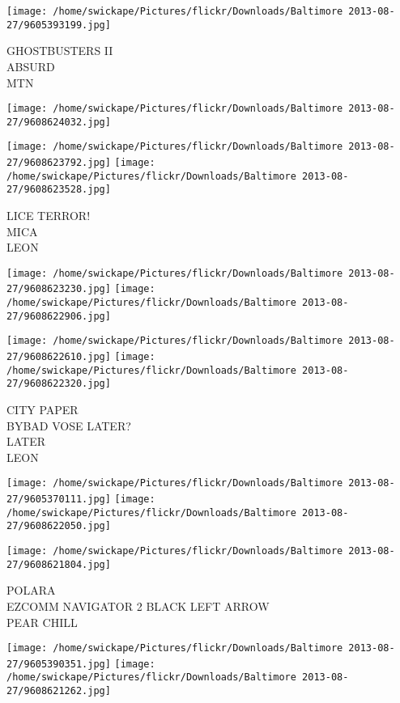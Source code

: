 \documentclass[10pt,letterpaper]{article}
\begin{document}
\texttt{[image: /home/swickape/Pictures/flickr/Downloads/Baltimore 2013-08-27/9605393199.jpg]}

GHOSTBUSTERS II\\
ABSURD\\
MTN
\pagebreak

\texttt{[image: /home/swickape/Pictures/flickr/Downloads/Baltimore 2013-08-27/9608624032.jpg]}

\vspace{0.25in}
\texttt{[image: /home/swickape/Pictures/flickr/Downloads/Baltimore 2013-08-27/9608623792.jpg]}
\texttt{[image: /home/swickape/Pictures/flickr/Downloads/Baltimore 2013-08-27/9608623528.jpg]}

LICE TERROR!\\
MICA\\
LEON
\pagebreak

\texttt{[image: /home/swickape/Pictures/flickr/Downloads/Baltimore 2013-08-27/9608623230.jpg]}
\texttt{[image: /home/swickape/Pictures/flickr/Downloads/Baltimore 2013-08-27/9608622906.jpg]}

\texttt{[image: /home/swickape/Pictures/flickr/Downloads/Baltimore 2013-08-27/9608622610.jpg]}
\texttt{[image: /home/swickape/Pictures/flickr/Downloads/Baltimore 2013-08-27/9608622320.jpg]}

CITY PAPER\\
BYBAD VOSE LATER?\\
LATER\\
LEON
\pagebreak

\texttt{[image: /home/swickape/Pictures/flickr/Downloads/Baltimore 2013-08-27/9605370111.jpg]}
\texttt{[image: /home/swickape/Pictures/flickr/Downloads/Baltimore 2013-08-27/9608622050.jpg]}

\vspace{0.25in}
\texttt{[image: /home/swickape/Pictures/flickr/Downloads/Baltimore 2013-08-27/9608621804.jpg]}

POLARA\\
EZCOMM NAVIGATOR 2 BLACK LEFT ARROW\\
PEAR CHILL
\pagebreak

\texttt{[image: /home/swickape/Pictures/flickr/Downloads/Baltimore 2013-08-27/9605390351.jpg]}
\texttt{[image: /home/swickape/Pictures/flickr/Downloads/Baltimore 2013-08-27/9608621262.jpg]}
\end{document}
